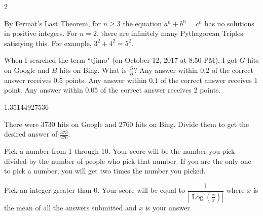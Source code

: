 \documentclass[11pt]{article}
\begin{document}
\begin{answer}
2
\end{answer}

\begin{solution}
By Fermat's Last Theorem, for $n \ge 3$ the equation $a^n + b^n = c^n$ has no solutions in positive integers. For $n = 2$, there
are infinitely many Pythagorean Triples satisfying this. For example, $3^2 + 4^2 = 5^2$.
\end{solution}

\begin{problem}
When I searched the term ``tjimo" (on October 12, 2017 at 8:50 PM), I got $G$ hits on Google and $B$ hits on Bing. What is $\frac{G}{B}$?
Any answer within $0.2$ of the correct answer receives $0.5$ points. Any answer within $0.1$ of the correct answer receives $1$ point.
Any answer within $0.05$ of the correct answer receives $2$ points.
\end{problem}

\begin{answer}
1.35144927536
\end{answer}

\begin{solution}
There were 3730 hits on Google and 2760 hits on Bing. Divide them to get the desired answer of $\frac{373}{276}$.
\end{solution}

\begin{problem}
Pick a number from 1 through 10. Your score will be the number you pick divided by the number of people who pick that number. If you are the only one to pick a number, you will get two times the number you picked.
\end{problem}

\begin{problem}
Pick an integer greater than 0. Your score will be equal to $\dfrac{1}{|\operatorname{Log}(\frac{\overline{x}}{x})|}$ 
where $\overline{x}$ is the mean of all the answers submitted and $x$ is your answer.
\end{problem}
\end{document}
